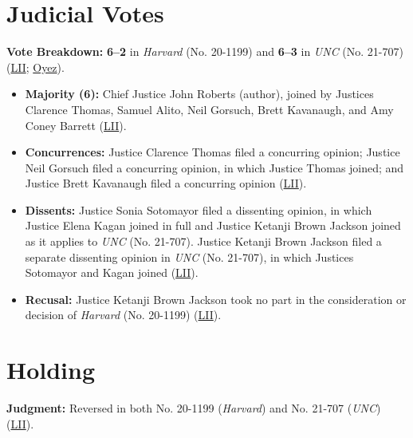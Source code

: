 \documentclass[12pt]{article}
\begin{document}
\section{Judicial Votes}

\textbf{Vote Breakdown:} \textbf{6--2} in \textit{Harvard} (No. 20-1199) and \textbf{6--3} in \textit{UNC} (No. 21-707) (\href{https://www.law.cornell.edu/supremecourt/text/20-1199}{LII}; \href{https://www.oyez.org/cases/2022/20-1199}{Oyez}).
\begin{itemize}
\item \textbf{Majority (6):} Chief Justice John Roberts (author), joined by Justices Clarence Thomas, Samuel Alito, Neil Gorsuch, Brett Kavanaugh, and Amy Coney Barrett (\href{https://www.law.cornell.edu/supremecourt/text/20-1199}{LII}).
\item \textbf{Concurrences:} Justice Clarence Thomas filed a concurring opinion; Justice Neil Gorsuch filed a concurring opinion, in which Justice Thomas joined; and Justice Brett Kavanaugh filed a concurring opinion (\href{https://www.law.cornell.edu/supremecourt/text/20-1199}{LII}).
\item \textbf{Dissents:} Justice Sonia Sotomayor filed a dissenting opinion, in which Justice Elena Kagan joined in full and Justice Ketanji Brown Jackson joined as it applies to \textit{UNC} (No. 21-707). Justice Ketanji Brown Jackson filed a separate dissenting opinion in \textit{UNC} (No. 21-707), in which Justices Sotomayor and Kagan joined (\href{https://www.law.cornell.edu/supremecourt/text/20-1199}{LII}).
\item \textbf{Recusal:} Justice Ketanji Brown Jackson took no part in the consideration or decision of \textit{Harvard} (No. 20-1199) (\href{https://www.law.cornell.edu/supremecourt/text/20-1199}{LII}).
\end{itemize}

\section{Holding}

\textbf{Judgment:} Reversed in both No. 20-1199 (\textit{Harvard}) and No. 21-707 (\textit{UNC}) (\href{https://www.law.cornell.edu/supremecourt/text/20-1199}{LII}).
\end{document}
